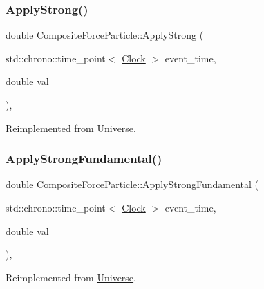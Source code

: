 \subsubsection{\texorpdfstring{Apply\+Strong()}{ApplyStrong()}}
{\footnotesize\ttfamily double Composite\+Force\+Particle\+::\+Apply\+Strong (\begin{DoxyParamCaption}\item[{std\+::chrono\+::time\+\_\+point$<$ \mbox{\hyperlink{universe_8h_a0ef8d951d1ca5ab3cfaf7ab4c7a6fd80}{Clock}} $>$}]{event\+\_\+time,  }\item[{double}]{val }\end{DoxyParamCaption})\hspace{0.3cm}{\ttfamily [inline]}, {\ttfamily [virtual]}}



Reimplemented from \mbox{\hyperlink{classUniverse_a906a88b37f10bfa630bef49dfd0e907a}{Universe}}.

\mbox{\label{classCompositeForceParticle_a64fe19ee12d6ca0a69f650faa5bedb58}} 
\subsubsection{\texorpdfstring{Apply\+Strong\+Fundamental()}{ApplyStrongFundamental()}}
{\footnotesize\ttfamily double Composite\+Force\+Particle\+::\+Apply\+Strong\+Fundamental (\begin{DoxyParamCaption}\item[{std\+::chrono\+::time\+\_\+point$<$ \mbox{\hyperlink{universe_8h_a0ef8d951d1ca5ab3cfaf7ab4c7a6fd80}{Clock}} $>$}]{event\+\_\+time,  }\item[{double}]{val }\end{DoxyParamCaption})\hspace{0.3cm}{\ttfamily [inline]}, {\ttfamily [virtual]}}



Reimplemented from \mbox{\hyperlink{classUniverse_a62789bcff84bd750b0366004381e2fdd}{Universe}}.

\mbox{\label{classCompositeForceParticle_ae0937405e68dd40b19036d5a359f7e07}} 
